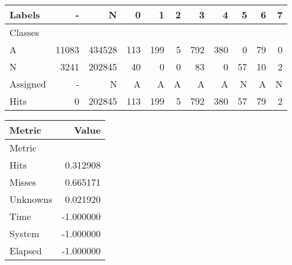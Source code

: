\begin{tabular}{l|r|r|r|r|r|r|r|r|r|r}

Labels &      - &       N &    0 &    1 &  2 &    3 &    4 &   5 &   6 &  7 \\\hline
Classes  &        &         &      &      &    &      &      &     &     &    \\\hline
\hline
A        &  11083 &  434528 &  113 &  199 &  5 &  792 &  380 &   0 &  79 &  0 \\\hline
N        &   3241 &  202845 &   40 &    0 &  0 &   83 &    0 &  57 &  10 &  2 \\\hline
\hline
Assigned &      - &       N &    A &    A &  A &    A &    A &   N &   A &  N \\\hline
Hits     &      0 &  202845 &  113 &  199 &  5 &  792 &  380 &  57 &  79 &  2 
\end{tabular}
\begin{tabular}{l|r}

Metric   &     Value \\\hline
Metric   &           \\\hline
\hline
Hits     &  0.312908 \\\hline
Misses   &  0.665171 \\\hline
Unknowns &  0.021920 \\\hline
Time     & -1.000000 \\\hline
System   & -1.000000 \\\hline
Elapsed  & -1.000000 
\end{tabular}
